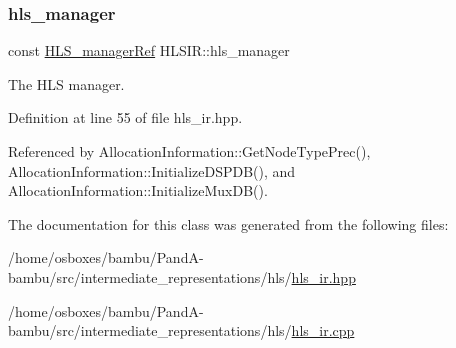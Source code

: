 \subsubsection{\texorpdfstring{hls\+\_\+manager}{hls\_manager}}
{\footnotesize\ttfamily const \hyperlink{hls__manager_8hpp_acd3842b8589fe52c08fc0b2fcc813bfe}{H\+L\+S\+\_\+manager\+Ref} H\+L\+S\+I\+R\+::hls\+\_\+manager\hspace{0.3cm}{\ttfamily [protected]}}



The H\+LS manager. 



Definition at line 55 of file hls\+\_\+ir.\+hpp.



Referenced by Allocation\+Information\+::\+Get\+Node\+Type\+Prec(), Allocation\+Information\+::\+Initialize\+D\+S\+P\+D\+B(), and Allocation\+Information\+::\+Initialize\+Mux\+D\+B().



The documentation for this class was generated from the following files\+:\begin{DoxyCompactItemize}
\item 
/home/osboxes/bambu/\+Pand\+A-\/bambu/src/intermediate\+\_\+representations/hls/\hyperlink{hls__ir_8hpp}{hls\+\_\+ir.\+hpp}\item 
/home/osboxes/bambu/\+Pand\+A-\/bambu/src/intermediate\+\_\+representations/hls/\hyperlink{hls__ir_8cpp}{hls\+\_\+ir.\+cpp}\end{DoxyCompactItemize}
